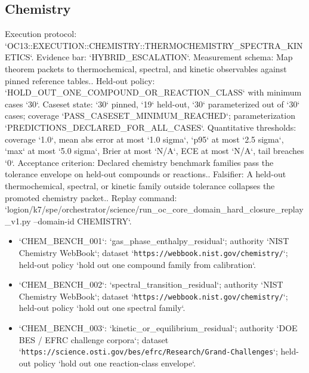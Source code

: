 \subsection{Chemistry}
Execution protocol: `OC13::EXECUTION::CHEMISTRY::THERMOCHEMISTRY\_SPECTRA\_KINETICS`. Evidence bar: `HYBRID\_ESCALATION`.
Measurement schema: Map theorem packets to thermochemical, spectral, and kinetic observables against pinned reference tables..
Held-out policy: `HOLD\_OUT\_ONE\_COMPOUND\_OR\_REACTION\_CLASS` with minimum cases `30`.
Caseset state: `30` pinned, `19` held-out, `30` parameterized out of `30` cases; coverage `PASS\_CASESET\_MINIMUM\_REACHED`; parameterization `PREDICTIONS\_DECLARED\_FOR\_ALL\_CASES`.
Quantitative thresholds: coverage `1.0`, mean abs error at most `1.0 sigma`, `p95` at most `2.5 sigma`, `max` at most `5.0 sigma`, Brier at most `N/A`, ECE at most `N/A`, tail breaches `0`.
Acceptance criterion: Declared chemistry benchmark families pass the tolerance envelope on held-out compounds or reactions..
Falsifier: A held-out thermochemical, spectral, or kinetic family outside tolerance collapses the promoted chemistry packet..
Replay command: `logion/k7/spe/orchestrator/science/run\_oc\_core\_domain\_hard\_closure\_replay\_v1.py --domain-id CHEMISTRY`.
\begin{itemize}
\item `CHEM\_BENCH\_001`: `gas\_phase\_enthalpy\_residual`; authority `NIST Chemistry WebBook`; dataset `\texttt{https://webbook.nist.gov/chemistry/}`; held-out policy `hold out one compound family from calibration`.
\item `CHEM\_BENCH\_002`: `spectral\_transition\_residual`; authority `NIST Chemistry WebBook`; dataset `\texttt{https://webbook.nist.gov/chemistry/}`; held-out policy `hold out one spectral family`.
\item `CHEM\_BENCH\_003`: `kinetic\_or\_equilibrium\_residual`; authority `DOE BES / EFRC challenge corpora`; dataset `\texttt{https://science.osti.gov/bes/efrc/Research/Grand-Challenges}`; held-out policy `hold out one reaction-class envelope`.
\end{itemize}

